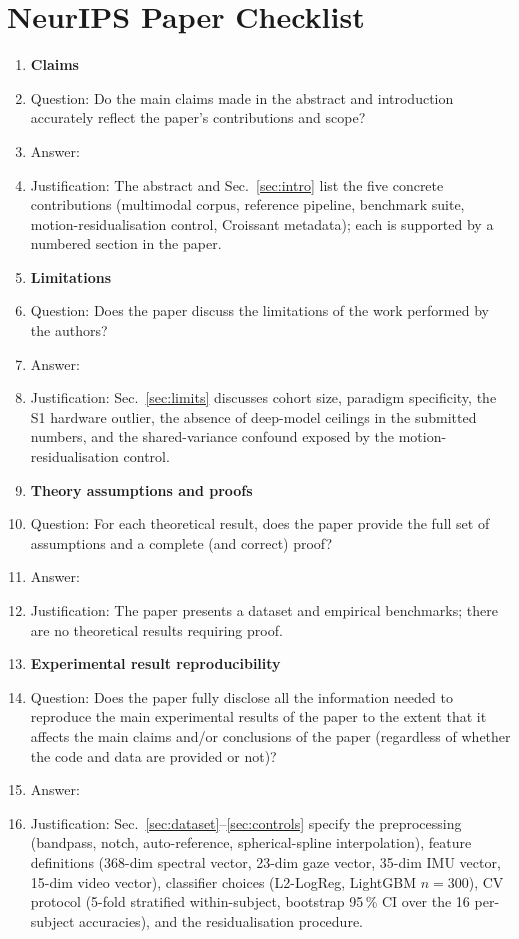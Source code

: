 \section*{NeurIPS Paper Checklist}

\begin{enumerate}

\item {\bf Claims}
    \item[] Question: Do the main claims made in the abstract and introduction accurately reflect the paper's contributions and scope?
    \item[] Answer: \answerYes{}
    \item[] Justification: The abstract and Sec.~\ref{sec:intro} list the five concrete contributions (multimodal corpus, reference pipeline, benchmark suite, motion-residualisation control, Croissant metadata); each is supported by a numbered section in the paper.

\item {\bf Limitations}
    \item[] Question: Does the paper discuss the limitations of the work performed by the authors?
    \item[] Answer: \answerYes{}
    \item[] Justification: Sec.~\ref{sec:limits} discusses cohort size, paradigm specificity, the S1 hardware outlier, the absence of deep-model ceilings in the submitted numbers, and the shared-variance confound exposed by the motion-residualisation control.

\item {\bf Theory assumptions and proofs}
    \item[] Question: For each theoretical result, does the paper provide the full set of assumptions and a complete (and correct) proof?
    \item[] Answer: \answerNA{}
    \item[] Justification: The paper presents a dataset and empirical benchmarks; there are no theoretical results requiring proof.

\item {\bf Experimental result reproducibility}
    \item[] Question: Does the paper fully disclose all the information needed to reproduce the main experimental results of the paper to the extent that it affects the main claims and/or conclusions of the paper (regardless of whether the code and data are provided or not)?
    \item[] Answer: \answerYes{}
    \item[] Justification: Sec.~\ref{sec:dataset}--\ref{sec:controls} specify the preprocessing (bandpass, notch, auto-reference, spherical-spline interpolation), feature definitions (368-dim spectral vector, 23-dim gaze vector, 35-dim IMU vector, 15-dim video vector), classifier choices (L2-LogReg, LightGBM $n{=}300$), CV protocol (5-fold stratified within-subject, bootstrap 95\,\% CI over the 16 per-subject accuracies), and the residualisation procedure.


\end{enumerate}
